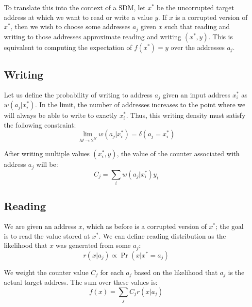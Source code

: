 \documentclass[10pt,letterpaper]{article}
\begin{document}
To translate this into the context of a SDM, let $x^*$ be the
uncorrupted target address at which we want to read or write a value
$y$. If $x$ is a corrupted version of $x^*$, then we wish to choose
some addresses $a_j$ given $x$ such that reading and writing to those
addresses approximate reading and writing $(x^*,y)$. This is
equivalent to computing the expectation of $f(x^*)=y$ over the
addresses $a_j$.

\subsection{Writing}

Let us define the probability of writing to address $a_j$ given an
input address $x_i^*$ as $w(a_j|x_i^*)$. In the limit, the number of
addresses increases to the point where we will always be able to write
to exactly $x_i^*$. Thus, this writing density must satisfy the
following constraint:
\begin{equation}
\lim_{M\rightarrow 2^N}w(a_j|x_i^*) = \delta(a_j=x_i^*)
\label{eq:w}
\end{equation}

After writing multiple values $(x_i^*, y)$, the value of the counter
associated with address $a_j$ will be:
\begin{equation}
C_j=\sum_i w(a_j|x_i^*)y_i
\label{eq:Cj}
\end{equation}

\subsection{Reading}

We are given an address $x$, which as before is a corrupted version of
$x^*$; the goal is to read the value stored at $x^*$. We can define
reading distribution as the likelihood that $x$ was generated from
some $a_j$:
\begin{equation}
r(x| a_j)\propto \Pr(x|x^*=a_j)
\label{eq:r}
\end{equation}

We weight the counter value $C_j$ for each $a_j$ based on the
likelihood that $a_j$ is the actual target address. The sum over these
values is:
\begin{equation}
f(x)=\sum_j C_j r(x| a_j)
\label{eq:R}
\end{equation}

\end{document}
